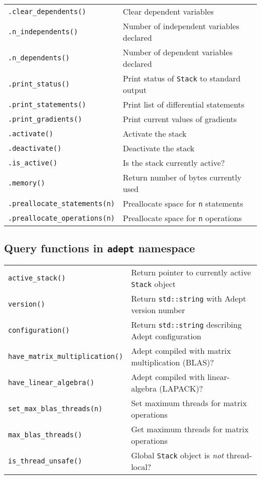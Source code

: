 \documentclass[10pt,a4,landscape]{article}
\def\code#1{\texttt{#1}}
\begin{document}
\begin{tabular}{ll}
\code{.clear\_dependents()} & Clear dependent variables\\
\code{.n\_independents()} & Number of independent variables declared \\
\code{.n\_dependents()} & Number of dependent variables declared\\
\code{.print\_status()} & Print status of \code{Stack} to standard output\\
\code{.print\_statements()} & Print list of differential statements\\
\code{.print\_gradients()} & Print current values of gradients\\
\code{.activate()} & Activate the stack \\
\code{.deactivate()} & Deactivate the stack\\
\code{.is\_active()} & Is the stack currently active?\\
\code{.memory()} & Return number of bytes currently used\\
\code{.preallocate\_statements(n)} & Preallocate space for \code{n} statements\\
\code{.preallocate\_operations(n)} & Preallocate space for \code{n} operations\\
\end{tabular}

\subsection*{Query functions in \code{adept} namespace}
\begin{tabular}{ll}
\code{active\_stack()} & Return pointer to currently active \code{Stack} object\\
\code{version()} & Return \code{std::string} with Adept version number\\
\code{configuration()} & Return \code{std::string} describing Adept configuration\\
\code{have\_matrix\_multiplication()} & Adept compiled with matrix multiplication (BLAS)?\\
\code{have\_linear\_algebra()} & Adept compiled with linear-algebra (LAPACK)?\\
\code{set\_max\_blas\_threads(n)} & Set maximum threads for matrix operations\\
\code{max\_blas\_threads()} & Get maximum threads for matrix operations\\
\code{is\_thread\_unsafe()} & Global \code{Stack} object is \textit{not} thread-local?\\
\end{tabular}
\newpage
\end{document}
